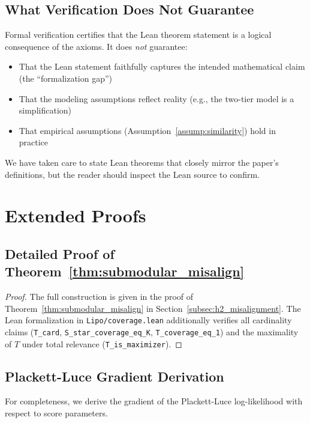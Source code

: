 \documentclass[11pt,a4paper]{article}
\theoremstyle{definition}
\theoremstyle{plain}
\theoremstyle{remark}
\begin{document}
\subsection{What Verification Does Not Guarantee}
\label{app:verification_limits}

Formal verification certifies that the Lean theorem statement is a logical consequence of the axioms. It does \textit{not} guarantee:
\begin{itemize}
    \item That the Lean statement faithfully captures the intended mathematical claim (the ``formalization gap'')
    \item That the modeling assumptions reflect reality (e.g., the two-tier model is a simplification)
    \item That empirical assumptions (Assumption~\ref{assump:similarity}) hold in practice
\end{itemize}

We have taken care to state Lean theorems that closely mirror the paper's definitions, but the reader should inspect the Lean source to confirm.

\section{Extended Proofs}
\label{app:proofs}

\subsection{Detailed Proof of Theorem~\ref{thm:submodular_misalign}}
\label{app:proof_misalign}

\begin{proof}
The full construction is given in the proof of Theorem~\ref{thm:submodular_misalign} in Section~\ref{subsec:h2_misalignment}. The Lean formalization in \texttt{Lipo/coverage.lean} additionally verifies all cardinality claims (\texttt{T\_card}, \texttt{S\_star\_coverage\_eq\_K}, \texttt{T\_coverage\_eq\_1}) and the maximality of $T$ under total relevance (\texttt{T\_is\_maximizer}).
\end{proof}

\subsection{Plackett-Luce Gradient Derivation}
\label{app:pl_gradient}

For completeness, we derive the gradient of the Plackett-Luce log-likelihood with respect to score parameters.
\end{document}
